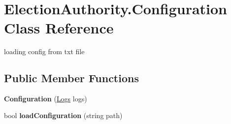 \hypertarget{class_election_authority_1_1_configuration}{}\section{Election\+Authority.\+Configuration Class Reference}
\label{class_election_authority_1_1_configuration}


loading config from txt file  


\subsection*{Public Member Functions}
\begin{DoxyCompactItemize}
\item 
\hypertarget{class_election_authority_1_1_configuration_a6fbd2e89ab14280ab3a676cca7477cfd}{}{\bfseries Configuration} (\hyperlink{class_election_authority_1_1_logs}{Logs} logs)\label{class_election_authority_1_1_configuration_a6fbd2e89ab14280ab3a676cca7477cfd}

\item 
\hypertarget{class_election_authority_1_1_configuration_a97aa848259fc5132ec80672c90951815}{}bool {\bfseries load\+Configuration} (string path)\label{class_election_authority_1_1_configuration_a97aa848259fc5132ec80672c90951815}

\end{DoxyCompactItemize}
